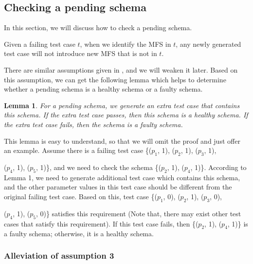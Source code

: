 \documentclass{sig-alternate-05-2015}
\begin{document}
{{\subsection{Checking a pending schema}
In this section, we will discuss how to check a pending schema.

\begin{assumption}
Given a failing test case $t$, when we identify the MFS in $t$, any newly generated test case will not introduce new MFS that is not in $t$.
\end{assumption}

There are similar assumptions given in \cite{zhang2011characterizing,martinez2008algorithms,martinez2009locating}, and we will weaken it later. Based on this assumption, we can get the following lemma which helps to determine whether a pending schema is a healthy schema or a faulty schema.
\newtheorem{lemma}{Lemma}
\begin{lemma}
For a pending schema, we generate an extra test case that contains this schema. If the extra test case passes, then this schema is a healthy schema. If the extra test case fails, then the schema is a faulty schema.
\end{lemma}
%

This lemma is easy to understand, so that we will omit the proof and just offer an example. Assume there is a failing test case \{($p_{1}$, 1), ($p_{2}$, 1), ($p_{3}$, 1), {($p_{4}$, 1), ($p_{5}$, 1)\}, and we need to check the schema \{($p_{2}$, 1), ($p_{4}$, 1)\}. According to Lemma 1, we need to generate additional test case which contains this schema, and the other parameter values in this test case should be different from the original failing test case. Based on this, test case \{($p_{1}$, 0), ($p_{2}$, 1), ($p_{3}$, 0), {($p_{4}$, 1), ($p_{5}$, 0)\} satisfies this requirement (Note that, there may exist other test cases that satisfy this requirement). If this test case fails, then \{($p_{2}$, 1), ($p_{4}$, 1)\} is a faulty schema; otherwise, it is a healthy schema.

\subsubsection{Alleviation of assumption 3}

}}}}
\end{document}

